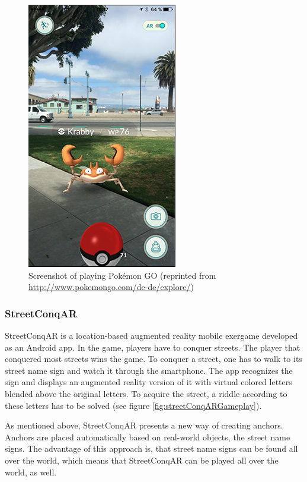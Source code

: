 \begin{figure}[bth]
  \centering
        \includegraphics[width=.45\linewidth]{gfx/pokemon_go_gameplay}
        \caption{Screenshot of playing Pok\'{e}mon GO (reprinted from \url{http://www.pokemongo.com/de-de/explore/})}
        \label{fig:pokemonGOGameplay}
\end{figure}

\subsubsection{StreetConqAR}
StreetConqAR \citep{hock2014augmented} is a location-based augmented reality mobile exergame developed as an Android app. In the game, players have to conquer streets. The player that conquered most streets wins the game. To conquer a street, one has to walk to its street name sign and watch it through the smartphone. The app recognizes the sign and displays an augmented reality version of it with virtual colored letters blended above the original letters. To acquire the street, a riddle according to these letters has to be solved (see figure \ref{fig:streetConqARGameplay}).

As mentioned above, StreetConqAR presents a new way of creating anchors. Anchors are placed automatically based on real-world objects, the street name signs. The advantage of this approach is, that street name signs can be found all over the world, which means that StreetConqAR can be played all over the world, as well.

